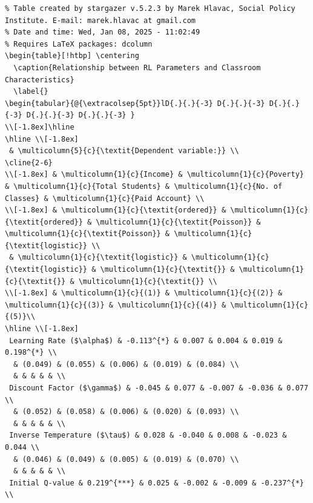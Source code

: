 \documentclass[
  number,
  preprint,
  3p,
  onecolumn]{elsarticle}
\begin{document}
\begin{table}
{\begin{verbatim}
% Table created by stargazer v.5.2.3 by Marek Hlavac, Social Policy Institute. E-mail: marek.hlavac at gmail.com
% Date and time: Wed, Jan 08, 2025 - 11:02:49
% Requires LaTeX packages: dcolumn 
\begin{table}[!htbp] \centering 
  \caption{Relationship between RL Parameters and Classroom Characteristics} 
  \label{} 
\begin{tabular}{@{\extracolsep{5pt}}lD{.}{.}{-3} D{.}{.}{-3} D{.}{.}{-3} D{.}{.}{-3} D{.}{.}{-3} } 
\\[-1.8ex]\hline 
\hline \\[-1.8ex] 
 & \multicolumn{5}{c}{\textit{Dependent variable:}} \\ 
\cline{2-6} 
\\[-1.8ex] & \multicolumn{1}{c}{Income} & \multicolumn{1}{c}{Poverty} & \multicolumn{1}{c}{Total Students} & \multicolumn{1}{c}{No. of Classes} & \multicolumn{1}{c}{Paid Account} \\ 
\\[-1.8ex] & \multicolumn{1}{c}{\textit{ordered}} & \multicolumn{1}{c}{\textit{ordered}} & \multicolumn{1}{c}{\textit{Poisson}} & \multicolumn{1}{c}{\textit{Poisson}} & \multicolumn{1}{c}{\textit{logistic}} \\ 
 & \multicolumn{1}{c}{\textit{logistic}} & \multicolumn{1}{c}{\textit{logistic}} & \multicolumn{1}{c}{\textit{}} & \multicolumn{1}{c}{\textit{}} & \multicolumn{1}{c}{\textit{}} \\ 
\\[-1.8ex] & \multicolumn{1}{c}{(1)} & \multicolumn{1}{c}{(2)} & \multicolumn{1}{c}{(3)} & \multicolumn{1}{c}{(4)} & \multicolumn{1}{c}{(5)}\\ 
\hline \\[-1.8ex] 
 Learning Rate ($\alpha$) & -0.113^{*} & 0.007 & 0.004 & 0.019 & 0.198^{*} \\ 
  & (0.049) & (0.055) & (0.006) & (0.019) & (0.084) \\ 
  & & & & & \\ 
 Discount Factor ($\gamma$) & -0.045 & 0.077 & -0.007 & -0.036 & 0.077 \\ 
  & (0.052) & (0.058) & (0.006) & (0.020) & (0.093) \\ 
  & & & & & \\ 
 Inverse Temperature ($\tau$) & 0.028 & -0.040 & 0.008 & -0.023 & 0.044 \\ 
  & (0.046) & (0.049) & (0.005) & (0.019) & (0.070) \\ 
  & & & & & \\ 
 Initial Q-value & 0.219^{***} & 0.025 & -0.002 & -0.009 & -0.237^{*} \\ 

\end{verbatim}}
\end{table}
\end{document}
